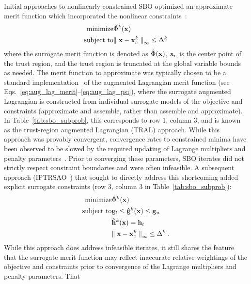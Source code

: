 Initial approaches to nonlinearly-constrained SBO optimized an
approximate merit function which incorporated the nonlinear
constraints~\cite{Rod98,Ale00}:
\begin{eqnarray}
{\rm minimize } & {\hat \Phi}^k({\bf x}) \nonumber \\
{\rm subject\  to } 
	& {\parallel {\bf x} - {\bf x}^k_c \parallel}_\infty \le \Delta^k
\label{eq:NLP_SBO_TRAL}
\end{eqnarray}
where the surrogate merit function is denoted as $\hat \Phi({\bf x})$,
${\bf x}_c$ is the center point of the trust region,
and the trust region is truncated at the global variable bounds as
needed.  The merit function to approximate was typically chosen to be
a standard implementation~\cite{Van84,Noc99,Gil81} of the
augmented Lagrangian merit function (see
Eqs.~\ref{eq:aug_lag_merit}--\ref{eq:aug_lag_psi}), where the
surrogate augmented Lagrangian is constructed from individual
surrogate models of the objective and constraints (approximate and
assemble, rather than assemble and approximate).  In
Table~\ref{tab:sbo_subprob}, this corresponds to row 1, column 3, and
is known as the trust-region augmented Lagrangian (TRAL) approach.
While this approach was provably convergent, convergence rates to
constrained minima have been observed to be slowed by the required
updating of Lagrange multipliers and penalty
parameters~\cite{Per04a}.  Prior to converging these parameters, SBO
iterates did not strictly respect constraint boundaries and were often
infeasible.  A subsequent approach (IPTRSAO~\cite{Per04a}) that
sought to directly address this shortcoming added explicit surrogate
constraints (row 3, column 3 in Table~\ref{tab:sbo_subprob}):
\begin{eqnarray}
{\rm minimize } & {\hat \Phi}^k({\bf x}) \nonumber \\
{\rm subject\  to } 
	& {\bf g}_l \le {\bf {\hat g}}^k({\bf x}) \le {\bf g}_u \nonumber \\
	&               {\bf {\hat h}}^k({\bf x}) = {\bf h}_t \nonumber \\
	& {\parallel {\bf x} - {\bf x}^k_c \parallel}_\infty \le \Delta^k \; . 
\label{eq:NLP_SBO_TRAL2}
\end{eqnarray}
While this approach does address infeasible iterates, it still shares
the feature that the surrogate merit function may reflect inaccurate
relative weightings of the objective and constraints prior to
convergence of the Lagrange multipliers and penalty parameters.  That

